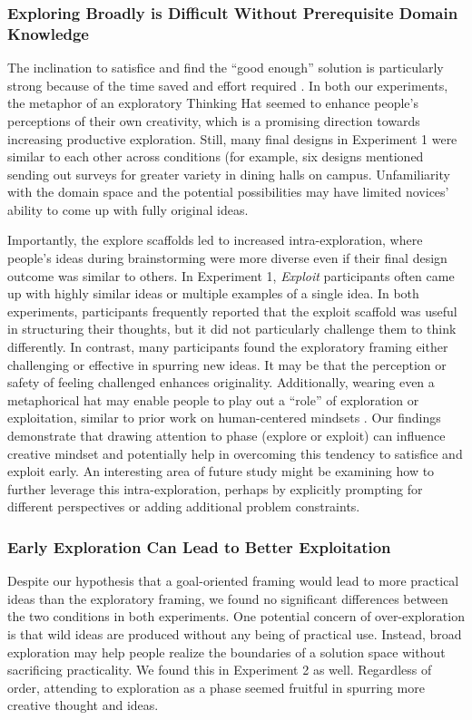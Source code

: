 \subsubsection{Exploring Broadly is Difficult Without Prerequisite Domain Knowledge}

The inclination to satisfice and find the ``good enough'' solution is particularly strong because of the time saved and effort required \cite{simon1972theories}. In both our experiments, the metaphor of an exploratory Thinking Hat seemed to enhance people's perceptions of their own creativity, which is a promising direction towards increasing productive exploration. Still, many final designs in Experiment 1 were similar to each other across conditions (for example, six designs mentioned sending out surveys for greater variety in dining halls on campus. Unfamiliarity with the domain space and the potential possibilities may have limited novices' ability to come up with fully original ideas. 

Importantly, the explore scaffolds led to increased intra-exploration, where people's ideas during brainstorming were more diverse even if their final design outcome was similar to others. In Experiment 1, \textit{Exploit} participants often came up with highly similar ideas or multiple examples of a single idea. In both experiments, participants frequently reported that the exploit scaffold was useful in structuring their thoughts, but it did not particularly challenge them to think differently. In contrast, many participants found the exploratory framing either challenging or effective in spurring new ideas. It may be that the perception or safety of feeling challenged enhances originality. Additionally, wearing even a metaphorical hat may enable people to play out a ``role'' of exploration or exploitation, similar to prior work on human-centered mindsets \cite{chou2017finding,teevan2017}. Our findings demonstrate that drawing attention to phase (explore or exploit) can influence creative mindset and potentially help in overcoming this tendency to satisfice and exploit early. An interesting area of future study might be examining how to further leverage this intra-exploration, perhaps by explicitly prompting for different perspectives or adding additional problem constraints.

\subsubsection{Early Exploration Can Lead to Better Exploitation}
Despite our hypothesis that a goal-oriented framing would lead to more practical ideas than the exploratory framing, we found no significant differences between the two conditions in both experiments. One potential concern of over-exploration is that wild ideas are produced without any being of practical use. Instead, broad exploration may help people realize the boundaries of a solution space without sacrificing practicality. We found this in Experiment 2 as well. Regardless of order, attending to exploration as a phase seemed fruitful in spurring more creative thought and ideas. 

